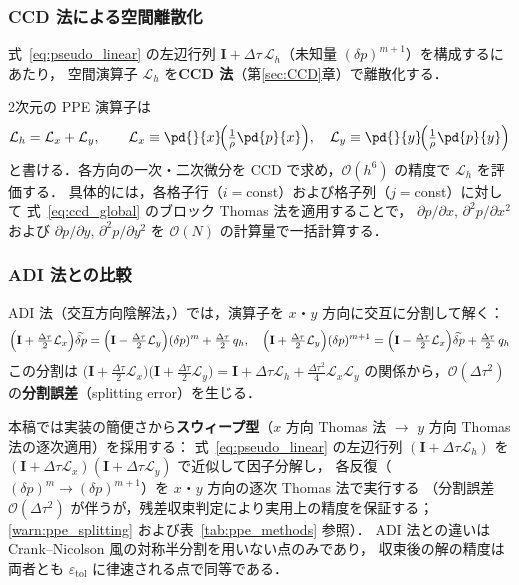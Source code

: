 \subsubsection{CCD 法による空間離散化}
\label{sec:pseudo_ccd_discretization}

式~\eqref{eq:pseudo_linear} の左辺行列 $\mathbf{I} + \Delta\tau\,\mathcal{L}_h$（未知量 $(\delta p)^{m+1}$）を構成するにあたり，
空間演算子 $\mathcal{L}_h$ を\textbf{CCD 法}（第\ref{sec:CCD}章）で離散化する．

2次元の PPE 演算子は
\begin{equation}
  \mathcal{L}_h = \mathcal{L}_x + \mathcal{L}_y,
  \qquad
  \mathcal{L}_x \equiv \pd{}{x}\!\Bigl(\tfrac{1}{\rho}\pd{p}{x}\Bigr),\quad
  \mathcal{L}_y \equiv \pd{}{y}\!\Bigl(\tfrac{1}{\rho}\pd{p}{y}\Bigr)
  \label{eq:L_split}
\end{equation}
と書ける．各方向の一次・二次微分を CCD で求め，$\mathcal{O}(h^6)$ の精度で $\mathcal{L}_h$ を評価する．
具体的には，各格子行（$i=$const）および格子列（$j=$const）に対して
式~\eqref{eq:ccd_global} のブロック Thomas 法を適用することで，
$\partial p/\partial x,\,\partial^2 p/\partial x^2$ および $\partial p/\partial y,\,\partial^2 p/\partial y^2$ を
$\mathcal{O}(N)$ の計算量で一括計算する．

\subsubsection{ADI 法との比較}
\label{sec:pseudo_adi_comparison}

ADI 法（交互方向陰解法，\cite{PeacemanRachford1955}）では，演算子を $x$・$y$ 方向に交互に分割して解く：
\begin{equation}
  \Bigl(\mathbf{I} + \tfrac{\Delta\tau}{2}\mathcal{L}_x\Bigr)\widetilde{\delta p}
  = \Bigl(\mathbf{I} - \tfrac{\Delta\tau}{2}\mathcal{L}_y\Bigr)(\delta p)^m + \tfrac{\Delta\tau}{2}\, q_h,
  \quad
  \Bigl(\mathbf{I} + \tfrac{\Delta\tau}{2}\mathcal{L}_y\Bigr)(\delta p)^{m+1}
  = \Bigl(\mathbf{I} - \tfrac{\Delta\tau}{2}\mathcal{L}_x\Bigr)\widetilde{\delta p} + \tfrac{\Delta\tau}{2}\, q_h
  \label{eq:ADI}
\end{equation}
この分割は
$
  \bigl(\mathbf{I}+\tfrac{\Delta\tau}{2}\mathcal{L}_x\bigr)
  \bigl(\mathbf{I}+\tfrac{\Delta\tau}{2}\mathcal{L}_y\bigr)
  = \mathbf{I} + \Delta\tau\mathcal{L}_h + \tfrac{\Delta\tau^2}{4}\mathcal{L}_x\mathcal{L}_y
$
の関係から，$\mathcal{O}(\Delta\tau^2)$ の\textbf{分割誤差}（splitting error）を生じる．

本稿では実装の簡便さから\textbf{スウィープ型}（$x$ 方向 Thomas 法 $\to$ $y$ 方向 Thomas 法の逐次適用）を採用する：
式~\eqref{eq:pseudo_linear} の左辺行列 $(\mathbf{I}+\Delta\tau\mathcal{L}_h)$ を
$(\mathbf{I}+\Delta\tau\mathcal{L}_x)(\mathbf{I}+\Delta\tau\mathcal{L}_y)$ で近似して因子分解し，
各反復（$(\delta p)^m \to (\delta p)^{m+1}$）を $x$・$y$ 方向の逐次 Thomas 法で実行する
（分割誤差 $\mathcal{O}(\Delta\tau^2)$ が伴うが，残差収束判定により実用上の精度を保証する；
\ref{warn:ppe_splitting} および表~\ref{tab:ppe_methods} 参照）．
ADI 法との違いは Crank--Nicolson 風の対称半分割を用いない点のみであり，
収束後の解の精度は両者とも $\varepsilon_\text{tol}$ に律速される点で同等である．

